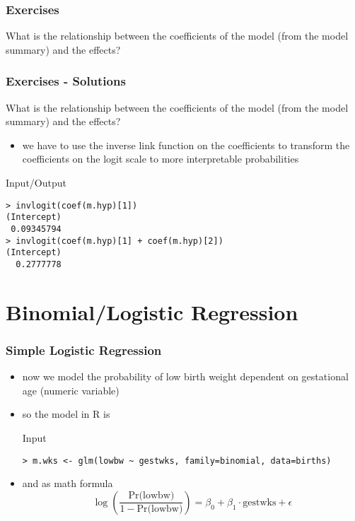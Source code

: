 \begin{frame}[fragile]\frametitle{Exercises}
  What is the relationship between the coefficients of the model (from the model summary) and the effects?
\end{frame}


\begin{frame}[fragile]\frametitle{Exercises - Solutions}
  What is the relationship between the coefficients of the model (from the model summary) and the effects?
  \begin{itemize}
  \item we have to use the inverse link function on the coefficients to transform the coefficients on the logit scale to more interpretable probabilities
  \end{itemize}
  \begin{exampleblock}{Input/Output}
\begin{verbatim}
> invlogit(coef(m.hyp)[1])
(Intercept) 
 0.09345794 
> invlogit(coef(m.hyp)[1] + coef(m.hyp)[2])
(Intercept) 
  0.2777778 
\end{verbatim}
  \end{exampleblock}
\end{frame}


\section{Binomial/Logistic Regression}

\begin{frame}[fragile]\frametitle{Simple Logistic Regression}
\begin{itemize}
\item now we model the probability of low birth weight dependent on gestational age (numeric variable)
\item so the model in R is 
  \begin{exampleblock}{Input}\footnotesize
\begin{verbatim}
> m.wks <- glm(lowbw ~ gestwks, family=binomial, data=births)
\end{verbatim}
  \end{exampleblock}\normalsize
\item and as math formula
$$ \log\left(\frac{\mbox{Pr(lowbw)}}{1-\mbox{Pr(lowbw)}}\right) = \beta_0 + \beta_1 \cdot \mbox{gestwks} + \epsilon$$
\end{itemize}
\end{frame}


